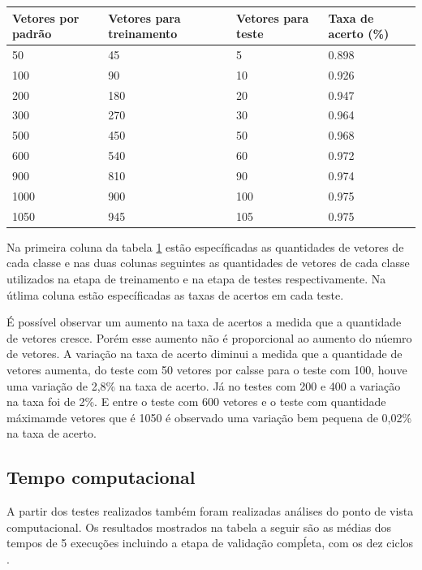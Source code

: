 \begin{table}[h!]
	\begin{tabular}{|l|l|l|l|}
        \hline
	Vetores por padrão & Vetores para treinamento & Vetores para teste & Taxa de acerto (\%)\\ \hline
    	   50   & 	45		   &		5	& 	0.898\\ \hline
   	  100   & 	90		   &	       10	&	0.926\\ \hline
	  200   &      180   		   &	       20	&	0.947\\ \hline
    	  300 	&      270		   &	       30	&	0.964\\ \hline
    	  500 	&      450  		   & 	       50	&	0.968\\ \hline
    	  600 	&      540		   &	       60	&	0.972\\ \hline
    	  900 	&      810		   &	       90	&	0.974\\ \hline
    	 1000 	&      900		   &	      100	&	0.975\\ \hline
    	 1050 	&      945		   &	      105	&	0.975\\ \hline
	\end{tabular}
	\label{tab:vetorxtaxa}
\end{table}

Na primeira coluna da tabela \ref{tab:vetorxtaxa} estão específicadas as quantidades de vetores de cada classe e nas duas colunas seguintes as quantidades de vetores de cada classe utilizados na etapa de treinamento e na etapa de testes respectivamente. Na útlima coluna estão específicadas as taxas de acertos em cada teste. 

É possível observar um aumento na taxa de acertos a medida que a quantidade de vetores cresce. Porém esse aumento não é proporcional ao aumento do núemro de vetores. A variação na taxa de acerto diminui a medida que a quantidade de vetores aumenta, do teste com 50 vetores por calsse para o teste com 100, houve uma variação de 2,8\% na taxa de acerto. Já no testes com 200 e 400 a variação na taxa foi de 2\%. E entre o teste com 600 vetores e o teste com quantidade máximamde vetores que é 1050 é observado uma variação bem pequena de 0,02\% na taxa de acerto.

\subsection{Tempo computacional}
A partir dos testes realizados também foram realizadas análises do ponto de vista computacional.
Os resultados mostrados na tabela a seguir são as médias dos tempos de 5 execuções incluindo a etapa de validação compĺeta, com os dez ciclos .

